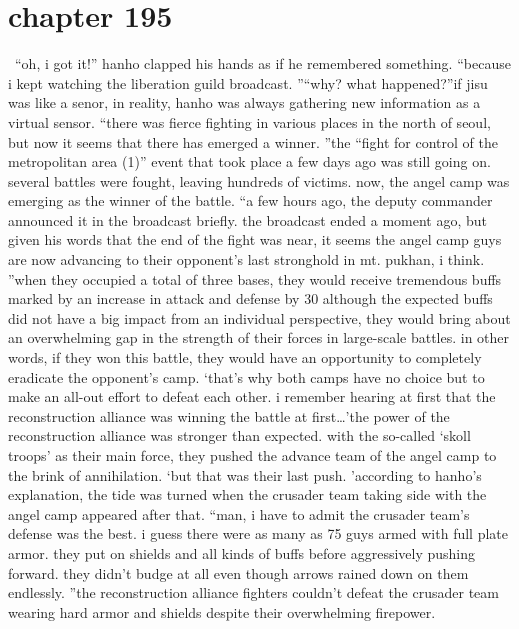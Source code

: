 \section{chapter 195}






 “oh, i got it!” hanho clapped his hands as if he remembered something.
 “because i kept watching the liberation guild broadcast.
”“why? what happened?”if jisu was like a senor, in reality, hanho was always gathering new information as a virtual sensor.
“there was fierce fighting in various places in the north of seoul, but now it seems that there has emerged a winner.
”the “fight for control of the metropolitan area (1)” event that took place a few days ago was still going on.
 several battles were fought, leaving hundreds of victims.
 now, the angel camp was emerging as the winner of the battle.
“a few hours ago, the deputy commander announced it in the broadcast briefly.
 the broadcast ended a moment ago, but given his words that the end of the fight was near, it seems the angel camp guys are now advancing to their opponent’s last stronghold in mt.
 pukhan, i think.
”when they occupied a total of three bases, they would receive tremendous buffs marked by an increase in attack and defense by 30%
although the expected buffs did not have a big impact from an individual perspective, they would bring about an overwhelming gap in the strength of their forces in large-scale battles.
in other words, if they won this battle, they would have an opportunity to completely eradicate the opponent’s camp.
‘that’s why both camps have no choice but to make an all-out effort to defeat each other.
 i remember hearing at first that the reconstruction alliance was winning the battle at first…’the power of the reconstruction alliance was stronger than expected.
 with the so-called ‘skoll troops’ as their main force, they pushed the advance team of the angel camp to the brink of annihilation.
‘but that was their last push.
’according to hanho’s explanation, the tide was turned when the crusader team taking side with the angel camp appeared after that.
“man, i have to admit the crusader team’s defense was the best.
 i guess there were as many as 75 guys armed with full plate armor.
 they put on shields and all kinds of buffs before aggressively pushing forward.
 they didn’t budge at all even though arrows rained down on them endlessly.
”the reconstruction alliance fighters couldn’t defeat the crusader team wearing hard armor and shields despite their overwhelming firepower.
